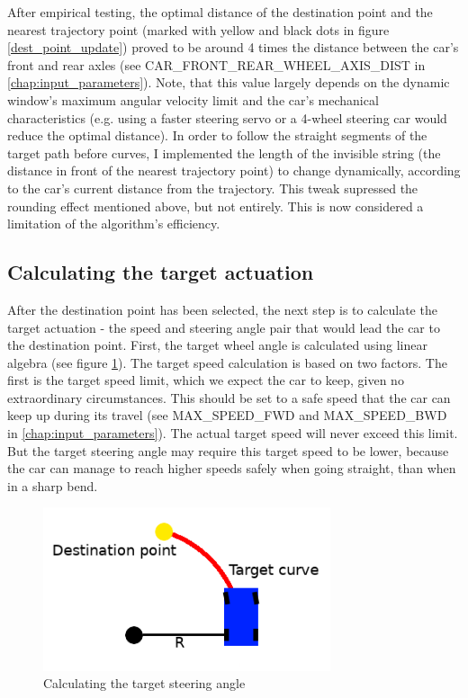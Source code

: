 After empirical testing, the optimal distance of the destination point and the nearest trajectory point (marked with yellow and black dots in figure \ref{dest_point_update}) proved to be around 4 times the distance between the car's front and rear axles (see CAR\_FRONT\_REAR\_WHEEL\_AXIS\_DIST in \ref{chap:input_parameters}). Note, that this value largely depends on the dynamic window's maximum angular velocity limit and the car's mechanical characteristics (e.g. using a faster steering servo or a 4-wheel steering car would reduce the optimal distance).
In order to follow the straight segments of the target path before curves, I implemented the length of the invisible string (the distance in front of the nearest trajectory point) to change dynamically, according to the car's current distance from the trajectory. This tweak supressed the rounding effect mentioned above, but not entirely. This is now considered a limitation of the algorithm's efficiency.

\subsection{Calculating the target actuation}
After the destination point has been selected, the next step is to calculate the target actuation - the speed and steering angle pair that would lead the car to the destination point. First, the target wheel angle is calculated using linear algebra (see figure \ref{calc_steering_angle}). The target speed calculation is based on two factors. The first is the target speed limit, which we expect the car to keep, given no extraordinary circumstances. This should be set to a safe speed that the car can keep up during its travel (see MAX\_SPEED\_FWD and MAX\_SPEED\_BWD in \ref{chap:input_parameters}). The actual target speed will never exceed this limit. But the target steering angle may require this target speed to be lower, because the car can manage to reach higher speeds safely when going straight, than when in a sharp bend.

\begin{figure}[!ht]
    \centering
    \includegraphics[height=48mm]{figures/raw/calc_steering_angle.png}
    \caption{Calculating the target steering angle}
    \label{calc_steering_angle}
\end{figure}

